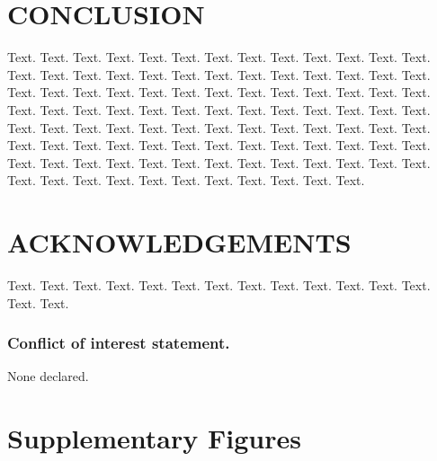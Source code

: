 \documentclass[a4,center,fleqn]{NAR}
\begin{document}
\section{CONCLUSION}

Text. Text. Text. Text. Text. Text. Text. Text. Text. Text. Text.
Text. Text. Text. Text. Text. Text. Text. Text. Text. Text. Text.
Text. Text. Text. Text. Text. Text. Text. Text. Text. Text. Text.
Text. Text. Text. Text. Text. Text. Text. Text. Text. Text. Text.
Text. Text. Text. Text. Text. Text. Text. Text. Text. Text. Text.
Text. Text. Text. Text. Text. Text. Text. Text. Text. Text. Text.
Text. Text. Text. Text. Text. Text. Text. Text. Text. Text. Text.
Text. Text. Text. Text. Text. Text. Text. Text. Text. Text. Text.
Text. Text. Text. Text. Text. Text. Text. Text. Text. Text. Text.
Text. Text. Text.


\section{ACKNOWLEDGEMENTS}

Text. Text. Text. Text. Text. Text. Text. Text. Text. Text. Text.
Text. Text. Text. Text.


\subsubsection{Conflict of interest statement.} None declared.






\section{Supplementary Figures}
\end{document}
